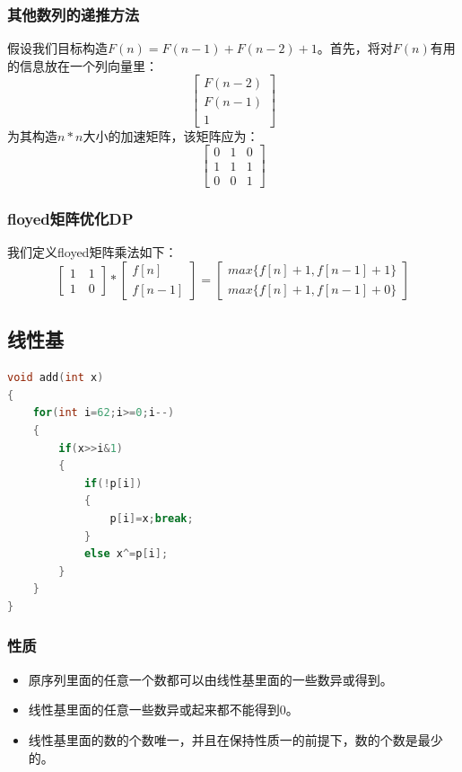 \documentclass[a4paper]{book}
\begin{document}
\subsubsection{其他数列的递推方法}
假设我们目标构造$F(n)=F(n-1)+F(n-2)+1$。首先，将对$F(n)$有用的信息放在一个列向量里：
$$
\begin{bmatrix}
    F(n-2)\\F(n-1)\\1
\end{bmatrix}
$$
为其构造$n*n$大小的加速矩阵，该矩阵应为：
$$
\begin{bmatrix}
    0 & 1 & 0\\1 & 1 & 1\\0 & 0 & 1
\end{bmatrix}
$$
\subsubsection{floyed矩阵优化DP}
我们定义floyed矩阵乘法如下：
$$
\begin{bmatrix}1 \quad 1\\1\quad 0\end{bmatrix}*\begin{bmatrix}f[n] \\ f[n-1]\end{bmatrix}=\begin{bmatrix}max\{f[n]+1,f[n-1]+1\} \\ max\{f[n]+1,f[n-1]+0\}\end{bmatrix}
$$

\subsection{线性基}
\begin{lstlisting}[language=c++]
void add(int x)
{
    for(int i=62;i>=0;i--)
    {
        if(x>>i&1)
        {
            if(!p[i])
            {
                p[i]=x;break;
            }
            else x^=p[i];
        }
    }
}
\end{lstlisting}
\subsubsection{性质}
\begin{itemize}
    \item 原序列里面的任意一个数都可以由线性基里面的一些数异或得到。
    \item 线性基里面的任意一些数异或起来都不能得到$0$。
    \item 线性基里面的数的个数唯一，并且在保持性质一的前提下，数的个数是最少的。
\end{itemize}
\end{document}
